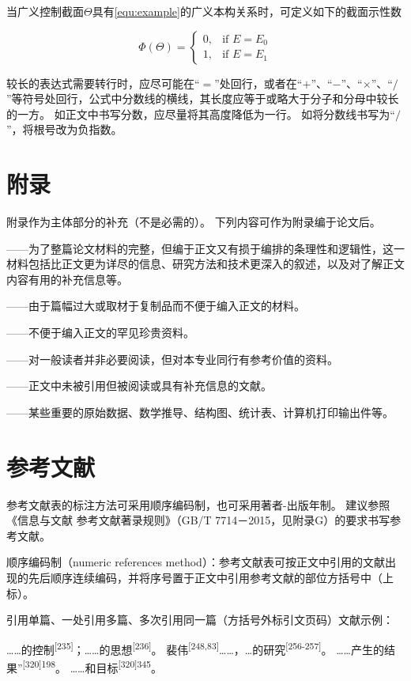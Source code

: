 当广义控制截面$\Theta$具有\ref{equ:example}的广义本构关系时，可定义如下的截面示性数

\begin{equation}
    \Phi\left(\Theta\right) =
    \begin{cases}
        0, & \text{if } E = E_{0} \\
        1, & \text{if } E = E_{1}
    \end{cases}
    \label{equ:example}
\end{equation}

较长的表达式需要转行时，应尽可能在“$=$”处回行，或者在“$+$”、“$-$”、“$\times$”、“$/$”等符号处回行，公式中分数线的横线，其长度应等于或略大于分子和分母中较长的一方。
如正文中书写分数，应尽量将其高度降低为一行。
如将分数线书写为“$/$”，将根号改为负指数。

\section{附录}

附录作为主体部分的补充（不是必需的）。
下列内容可作为附录编于论文后。

——为了整篇论文材料的完整，但编于正文又有损于编排的条理性和逻辑性，这一材料包括比正文更为详尽的信息、研究方法和技术更深入的叙述，以及对了解正文内容有用的补充信息等。

——由于篇幅过大或取材于复制品而不便于编入正文的材料。

——不便于编入正文的罕见珍贵资料。

——对一般读者并非必要阅读，但对本专业同行有参考价值的资料。

——正文中未被引用但被阅读或具有补充信息的文献。

——某些重要的原始数据、数学推导、结构图、统计表、计算机打印输出件等。

\section{参考文献}

参考文献表的标注方法可采用顺序编码制，也可采用著者-出版年制。
建议参照《信息与文献 参考文献著录规则》（GB/T 7714－2015，见附录G）的要求书写参考文献。

顺序编码制（numeric references method）：参考文献表可按正文中引用的文献出现的先后顺序连续编码，并将序号置于正文中引用参考文献的部位方括号中（上标）。

引用单篇、一处引用多篇、多次引用同一篇（方括号外标引文页码）文献示例：

……的控制\textsuperscript{[235]}；……的思想\textsuperscript{[236]}。
裴伟\textsuperscript{[248,83]}……，…的研究\textsuperscript{[256-257]}。
……产生的结果”\textsuperscript{[320]198}。
……和目标\textsuperscript{[320]345}。

